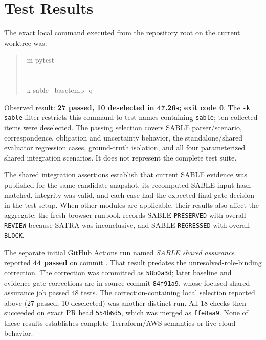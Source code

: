 \section{Test Results}
The exact local command executed from the repository root on the current worktree was:
\begin{quote}\small\ttfamily\sloppy\noindent
{} -m pytest \\
  \\
 \\
-k sable --basetemp  -q
\end{quote}
Observed result: \textbf{27 passed, 10 deselected in 47.26s; exit code 0}. The \texttt{-k sable} filter restricts this command to test names containing \texttt{sable}; ten collected items were deselected. The passing selection covers SABLE parser/scenario, correspondence, obligation and uncertainty behavior, the standalone/shared evaluator regression cases, ground-truth isolation, and all four parameterized shared integration scenarios. It does not represent the complete test suite.

\begin{sloppypar}
The shared integration assertions establish that current SABLE evidence was published for the same candidate snapshot, its recomputed SABLE input hash matched, integrity was valid, and each case had the expected final-gate decision in the test setup. When other modules are applicable, their results also affect the aggregate: the fresh browser runbook records SABLE \texttt{PRESERVED} with overall \texttt{REVIEW} because SATRA was inconclusive, and SABLE \texttt{REGRESSED} with overall \texttt{BLOCK}.
\end{sloppypar}

\begin{sloppypar}
The separate initial GitHub Actions run named \textit{SABLE shared assurance} reported \textbf{44 passed} on commit . That result predates the unresolved-role-binding correction. The correction was committed as \texttt{58b0a3d}; later baseline and evidence-gate corrections are in source commit \texttt{84f91a9}, whose focused shared-assurance job passed 48 tests. The correction-containing local selection reported above (27 passed, 10 deselected) was another distinct run. All 18 checks then succeeded on exact PR head \texttt{554b6d5}, which was merged as \texttt{ffe8aa9}. None of these results establishes complete Terraform/AWS semantics or live-cloud behavior.
\end{sloppypar}


